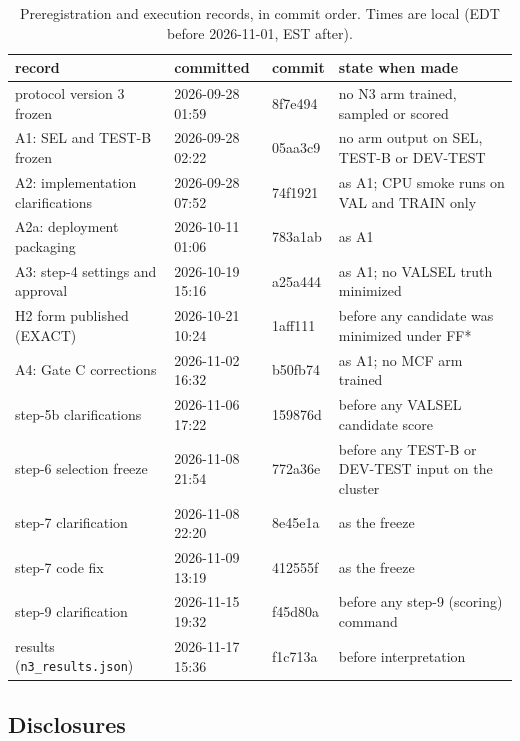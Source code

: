\begin{table}
\caption{Preregistration and execution records, in commit order. Times are local
(EDT before 2026-11-01, EST after).}
\label{tab:si_timeline}
\small
\begin{tabular}{@{}p{5.2cm}p{2.6cm}p{1.5cm}p{6.0cm}@{}}
\toprule
record & committed & commit & state when made \\
\midrule
protocol version 3 frozen & 2026-09-28 01:59 & 8f7e494 & no N3 arm trained, sampled or scored \\
A1: SEL and TEST-B frozen & 2026-09-28 02:22 & 05aa3c9 & no arm output on SEL, TEST-B or DEV-TEST \\
A2: implementation clarifications & 2026-09-28 07:52 & 74f1921 & as A1; CPU smoke runs on VAL and TRAIN only \\
A2a: deployment packaging & 2026-10-11 01:06 & 783a1ab & as A1 \\
A3: step-4 settings and approval & 2026-10-19 15:16 & a25a444 & as A1; no VALSEL truth minimized \\
H2 form published (EXACT) & 2026-10-21 10:24 & 1aff111 & before any candidate was minimized under FF* \\
A4: Gate C corrections & 2026-11-02 16:32 & b50fb74 & as A1; no MCF arm trained \\
step-5b clarifications & 2026-11-06 17:22 & 159876d & before any VALSEL candidate score \\
step-6 selection freeze & 2026-11-08 21:54 & 772a36e & before any TEST-B or DEV-TEST input on the cluster \\
step-7 clarification & 2026-11-08 22:20 & 8e45e1a & as the freeze \\
step-7 code fix & 2026-11-09 13:19 & 412555f & as the freeze \\
step-9 clarification & 2026-11-15 19:32 & f45d80a & before any step-9 (scoring) command \\
results (\texttt{n3\_results.json}) & 2026-11-17 15:36 & f1c713a & before interpretation \\
\bottomrule
\end{tabular}
\end{table}

\subsection{Disclosures}\label{si:disclosures}

